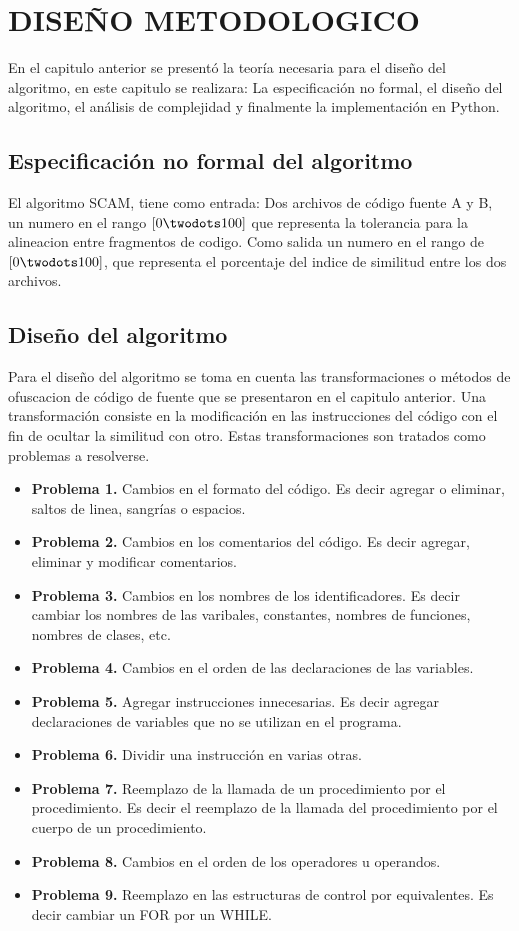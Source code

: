 \chapter{DISEÑO METODOLOGICO}
En el capitulo anterior se presentó la teoría necesaria para el diseño del algoritmo, en este capitulo se realizara: La especificación no formal, el diseño del algoritmo, el análisis de complejidad y finalmente la implementación en Python.

\section{Especificación no formal del algoritmo}
El algoritmo SCAM, tiene como entrada: Dos archivos de código fuente A y B, un numero en el rango $[0 \twodots 100]$ que representa la tolerancia para la alineacion entre fragmentos de codigo. Como salida un numero en el rango de $[0 \twodots 100]$, que representa el porcentaje del indice de similitud entre los dos archivos.

\section{Diseño del algoritmo}
Para el diseño del algoritmo se toma en cuenta las transformaciones o métodos de ofuscacion de código de fuente que se presentaron en el capitulo anterior. Una transformación consiste en la modificación en las instrucciones del código con el fin de ocultar la similitud con otro. Estas transformaciones son tratados como problemas a resolverse.

\begin{itemize}
  \item \textbf{Problema 1.} Cambios en el formato del código. Es decir agregar o eliminar, saltos de linea, sangrías o espacios.
  \item \textbf{Problema 2.} Cambios en los comentarios del código. Es decir agregar, eliminar y modificar comentarios.
  \item \textbf{Problema 3.} Cambios en los nombres de los identificadores. Es decir cambiar los nombres de las varibales, constantes, nombres de funciones, nombres de clases, etc.
  \item \textbf{Problema 4.} Cambios en el orden de las declaraciones de las variables.
  \item \textbf{Problema 5.} Agregar instrucciones innecesarias. Es decir agregar declaraciones de variables que no se utilizan en el programa.
  \item \textbf{Problema 6.} Dividir una instrucción en varias otras.
  \item \textbf{Problema 7.} Reemplazo de la llamada de un procedimiento por el procedimiento. Es decir el reemplazo de la llamada del procedimiento por el cuerpo de un procedimiento.
  \item \textbf{Problema 8.} Cambios en el orden de los operadores u operandos.
  \item \textbf{Problema 9.} Reemplazo en las estructuras de control por equivalentes. Es decir cambiar un FOR por un WHILE.
\end{itemize}

